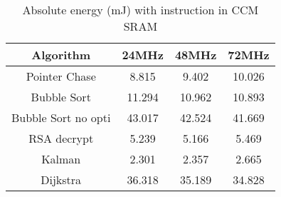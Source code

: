 
\begin{table}[h!]
\centering
\begin{tabular}{|c c c c|} 
 \hline
 Algorithm & 24MHz & 48MHz & 72MHz \\ [0.5ex] 
 \hline\hline
 Pointer Chase & 8.815 & 9.402 & 10.026 \\ 
 Bubble Sort & 11.294 & 10.962 & 10.893 \\
 Bubble Sort no opti & 43.017 & 42.524 & 41.669 \\
 RSA decrypt & 5.239 & 5.166 & 5.469 \\
 Kalman & 2.301 & 2.357 & 2.665 \\
 Dijkstra & 36.318 & 35.189 & 34.828 \\[1ex] 
 \hline
\end{tabular}
\caption{Absolute energy (mJ) with instruction in CCM SRAM}
\label{energy_tab_code_ccm}
\end{table}
